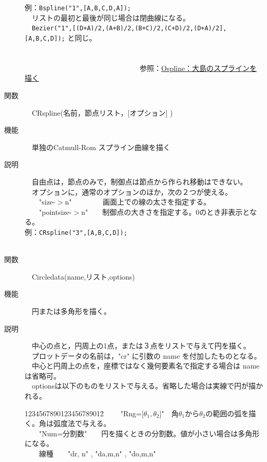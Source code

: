 \documentclass[papersize,a4paper,12pt,uplatex]{jsarticle}
\begin{document}
\begin{description}
例：\verb|Bspline("1",[A,B,C,D,A]);|\\
　リストの最初と最後が同じ場合は閉曲線になる。\\
　\verb|Bezier("1",[(D+A)/2,(A+B)/2,(B+C)/2,(C+D)/2,(D+A)/2],[A,B,C,D]);| と同じ。\\
　\\
　　　　
　\\
　　　　　　　　　　　　　　　　参照：\hyperlink{ospline}{Ospline：大島のスプラインを描く} \\

\hypertarget{crspline}{}
\item[関数]　CRspline(名前，節点リスト，[オプション] )
\item[機能]　単独のCatmull-Rom スプライン曲線を描く
\item[説明]
　自由点は，節点のみで，制御点は節点から作られ移動はできない。\\
　オプションに，通常のオプションのほか，次の２つが使える。\\
　　"size-$>$n" 　　　　画面上での線の太さを指定する。\\
　　"pointsize-$>$n"　　制御点の大きさを指定する。0のとき非表示となる。\\

例：\verb|CRspline("3",[A,B,C,D]);|\\
　　　
　\\
\hypertarget{circledata}{}
\item[関数]　Circledata(name,リスト,options)　
\item[機能]　円または多角形を描く。
\item[説明]　中心の点と，円周上の1点，または３点をリストで与えて円を描く。\\
　プロットデータの名前は，"cr" に引数の name を付加したものとなる。\\
　中心と円周上の点を，座標ではなく幾何要素名で指定する場合は name は省略可。\\
　optionsは以下のものをリストで与える。省略した場合は実線で円が描かれる。
\begin{tabbing}
1234567890123456789012\=\kill
　　"Rng=[$θ_1,θ_2$]"　\>角$θ_1$から$θ_2$の範囲の弧を描く。角は弧度法で与える。\\
　　"Num=分割数"　　\>円を描くときの分割数。値が小さい場合は多角形になる。\\
　　線種　　\>"dr, n"  , "da,m,n" , "do,m,n"\\


\end{tabbing}
\end{description}
\end{document}
